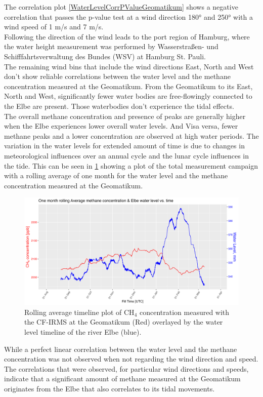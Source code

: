 The correlation plot \cref{WaterLevelCorrPValueGeomatikum} shows a negative correlation that  passes the p-value test at a wind direction 180° and 250° with a wind speed of 1 m/s and 7 m/s.  \\
Following the direction of the wind leads to the port region of Hamburg, where the water height measurement was performed by Wasserstraßen- und Schifffahrtsverwaltung des Bundes (WSV) at Hamburg St. Pauli.\\
The remaining wind bins that include the wind directions East, North and West don't show reliable correlations between the water level and the methane concentration measured at the Geomatikum.  From the Geomatikum to its East, North and West, significantly fewer  water bodies are free-flowingly connected to the Elbe are present. Those waterbodies don’t experience the tidal effects.\\
The overall methane concentration and presence of peaks are generally higher when the Elbe experiences lower overall water levels. And Visa versa, fewer methane peaks and a lower concentration are observed at high water periods. The variation in the water levels for extended amount of time is due to changes in meteorological influences over an annual cycle and the lunar cycle influences in the tide. This can be seen in \cref{TimelineCH4WaterlevelRollingAverage} showing a plot of the total measurement campaign with a rolling average of one month for the water level and the methane concentration measured at the Geomatikum.
\begin{figure}[htbp]
 \centering
 \includegraphics[width=1\textwidth]{figures/Appendix/Water_Level/1_CH4_WLRollingAverage.png}
 \caption[Rolling Average of one month CH$_4$ Timeline with Elbe Water level Overlay]{Rolling average timeline plot of CH$_4$ concentration measured with the CF-IRMS at the Geomatikum (Red) overlayed by the water level timeline of the river Elbe (blue).}
 \label{TimelineCH4WaterlevelRollingAverage}
\end{figure}
While a perfect linear correlation between the water level and the methane concentration was not observed when not regarding  the wind direction and speed. The correlations that were observed, for particular wind directions and speeds, indicate that a significant amount of methane measured at the Geomatikum originates from the Elbe that also correlates to its tidal movements.

